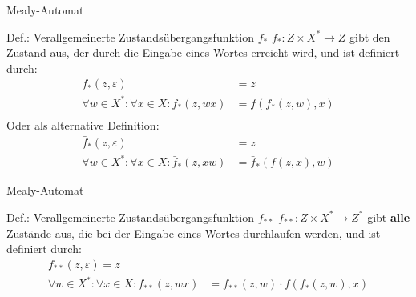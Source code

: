 \begin{frame}{Mealy-Automat}
	\begin{block}{Def.: Verallgemeinerte Zustandsübergangsfunktion $f_{\ast}$}
		$f_{\ast} : Z \times X^{\ast} \rightarrow Z$ gibt den Zustand aus, der durch die Eingabe eines Wortes erreicht wird, und ist definiert durch:
		\begin{align*}
			f_{\ast}(z,\varepsilon) &= z \\
			\forall w \in X^{\ast} : \forall x \in X : f_{\ast}(z,wx) &= f(f_{\ast}(z,w),x)\\
		\end{align*}
		Oder als alternative Definition:
		\begin{align*}
			\bar{f}_{\ast}(z,\varepsilon) &= z \\
			\forall w \in X^{\ast} : \forall x \in X : \bar{f}_{\ast}(z,xw) &= \bar{f}_{\ast}(f(z,x),w)
		\end{align*}
	\end{block}
\end{frame}

\begin{frame}{Mealy-Automat}
	\begin{block}{Def.: Verallgemeinerte Zustandsübergangsfunktion $f_{\ast\ast}$}
		$f_{\ast\ast} : Z \times X^{\ast} \rightarrow Z^{\ast}$ gibt \textbf{alle} Zustände aus, die bei der Eingabe eines Wortes durchlaufen werden, und ist definiert durch:
		\begin{align*}
			f_{\ast\ast}(z,\varepsilon) = z\\
			\forall w \in X^{\ast} : \forall x \in X : f_{\ast\ast}(z,wx) &= f_{\ast\ast}(z,w) \cdot f(f_{\ast}(z,w),x)\\
		\end{align*}
	\end{block}
\end{frame}

